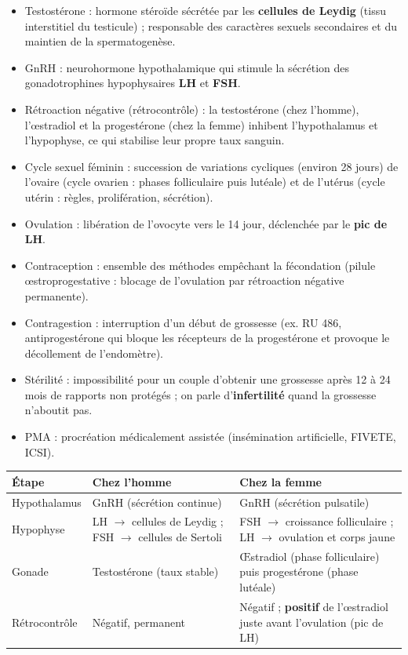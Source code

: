 \documentclass[11pt]{article}
\newcommand{\cle}[1]{{\popxbold\color{popdark}#1}}
\begin{document}
\begin{bilan}
\begin{itemize}
  \item \cle{Testostérone} : hormone stéroïde sécrétée par les \textbf{cellules de Leydig} (tissu interstitiel du testicule) ; responsable des caractères sexuels secondaires et du maintien de la spermatogenèse.
  \item \cle{GnRH} : neurohormone hypothalamique qui stimule la sécrétion des gonadotrophines hypophysaires \textbf{LH} et \textbf{FSH}.
  \item \cle{Rétroaction négative} (rétrocontrôle) : la testostérone (chez l'homme), l'\oe stradiol et la progestérone (chez la femme) inhibent l'hypothalamus et l'hypophyse, ce qui stabilise leur propre taux sanguin.
  \item \cle{Cycle sexuel féminin} : succession de variations cycliques (environ \num{28} jours) de l'ovaire (cycle ovarien : phases folliculaire puis lutéale) et de l'utérus (cycle utérin : règles, prolifération, sécrétion).
  \item \cle{Ovulation} : libération de l'ovocyte vers le \num{14}\ieme{} jour, déclenchée par le \textbf{pic de LH}.
  \item \cle{Contraception} : ensemble des méthodes empêchant la fécondation (pilule \oe stroprogestative : blocage de l'ovulation par rétroaction négative permanente).
  \item \cle{Contragestion} : interruption d'un début de grossesse (ex. RU 486, antiprogestérone qui bloque les récepteurs de la progestérone et provoque le décollement de l'endomètre).
  \item \cle{Stérilité} : impossibilité pour un couple d'obtenir une grossesse après 12 à 24 mois de rapports non protégés ; on parle d'\textbf{infertilité} quand la grossesse n'aboutit pas.
  \item \cle{PMA} : procréation médicalement assistée (insémination artificielle, FIVETE, ICSI).
\end{itemize}
\end{bilan}

\begin{bilan}
\begin{center}
\begin{tabularx}{\linewidth}{|l|X|X|}
\hline
\rowcolor{popblueL} \textbf{Étape} & \textbf{Chez l'homme} & \textbf{Chez la femme} \\
\hline
Hypothalamus & GnRH (sécrétion continue) & GnRH (sécrétion pulsatile) \\
\hline
Hypophyse & LH $\to$ cellules de Leydig ; FSH $\to$ cellules de Sertoli & FSH $\to$ croissance folliculaire ; LH $\to$ ovulation et corps jaune \\
\hline
Gonade & Testostérone (taux stable) & \OE stradiol (phase folliculaire) puis progestérone (phase lutéale) \\
\hline
Rétrocontrôle & Négatif, permanent & Négatif ; \textbf{positif} de l'\oe stradiol juste avant l'ovulation (pic de LH) \\
\hline
\end{tabularx}
\end{center}
\end{bilan}
\end{document}
